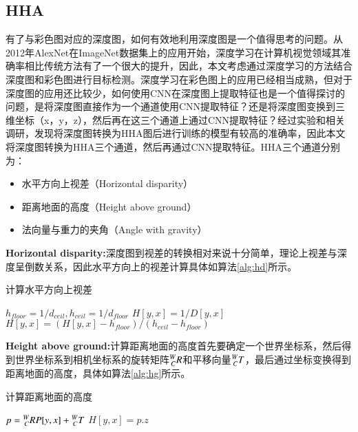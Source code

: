 \subsection{HHA}
\label{sec:hha}
有了与彩色图对应的深度图，如何有效地利用深度图是一个值得思考的问题。从2012年AlexNet\cite{Krizhevsky2012}在ImageNet\cite{imagenet}数据集上的应用开始，深度学习在计算机视觉领域其准确率相比传统方法有了一个很大的提升，因此，本文考虑通过深度学习的方法结合深度图和彩色图进行目标检测。深度学习在彩色图上的应用已经相当成熟，但对于深度图的应用还比较少，如何使用CNN在深度图上提取特征也是一个值得探讨的问题，是将深度图直接作为一个通道使用CNN提取特征？还是将深度图变换到三维坐标（x，y，z），然后再在这三个通道上通过CNN提取特征？经过实验和相关调研，发现将深度图转换为HHA图后进行训练的模型有较高的准确率\cite{Gupta2014}，因此本文将深度图转换为HHA三个通道，然后再通过CNN提取特征。HHA三个通道分别为：
\begin{itemize}
\item 水平方向上视差（Horizontal disparity）
\item 距离地面的高度（Height above ground）
\item 法向量与重力的夹角（Angle with gravity）
\end{itemize}
\textbf{Horizontal disparity:}深度图到视差的转换相对来说十分简单，理论上视差与深度呈倒数关系，因此水平方向上的视差计算具体如算法\ref{alg:hd}所示。
\begin{algorithm}[!ht]
  \caption{计算水平方向上视差}
  \label{alg:hd}
  $h_{floor} = 1 / d_{ceil}, h_{ceil} = 1 / d_{floor}$\;
   {
     {
      $H[y, x] = 1 / D[y, x]$\;
      $H[y, x] = (H[y, x] - h_{floor}) / (h_{ceil} - h_{floor})$\;
    }
  }
\end{algorithm}

\textbf{Height above ground:}计算距离地面的高度首先要确定一个世界坐标系，然后得到世界坐标系到相机坐标系的旋转矩阵$\prescript{W}{C}{R}$和平移向量$\prescript{W}{C}{T}$，最后通过坐标变换得到距离地面的高度，具体如算法\ref{alg:hg}所示。
\begin{algorithm}[!ht]
  \caption{计算距离地面的高度}
  \label{alg:hg}
   {
     {
      $p =  \prescript{W}{C}{R}P[y, x] + \prescript{W}{C}{T}$\;
      $H[y, x] = p.z$\;
    }
  }
\end{algorithm}

